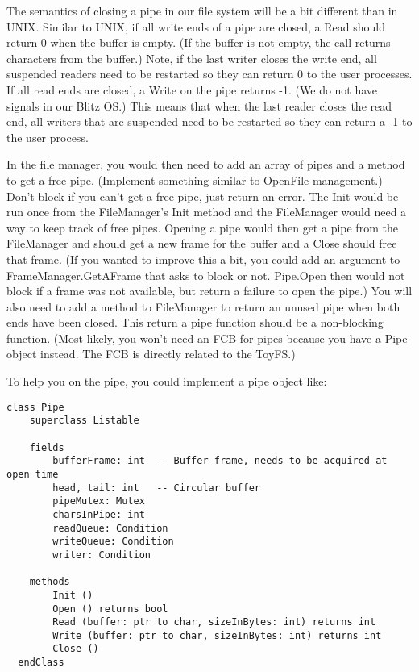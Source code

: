 \documentclass[11pt]{article}
\begin{document}
The semantics of closing a pipe in our file system will be a bit
different than in UNIX.  Similar to UNIX, if all write ends of a pipe
are closed, a Read should return 0 when the buffer is empty. (If the
buffer is not empty, the call returns characters from the buffer.)
Note, if the last writer closes the write end, all suspended readers
need to be restarted so they can return 0 to the user processes.  If
all read ends are closed, a Write on the pipe returns -1. (We do not
have signals in our Blitz OS.)  This means that when the last reader
closes the read end, all writers that are suspended need to be
restarted so they can return a -1 to the user process.

In the file manager, you would then need to add an array of pipes and
a method to get a free pipe. (Implement something similar to OpenFile
management.) Don't block if you can't get a free pipe, just return an
error.  The Init would be run once from the FileManager's Init method
and the FileManager would need a way to keep track of free pipes.
Opening a pipe would then get a pipe from the FileManager and should
get a new frame for the buffer and a Close should free that frame.
(If you wanted to improve this a bit, you could add an argument to
FrameManager.GetAFrame that asks to block or not.  Pipe.Open then
would not block if a frame was not available, but return a failure to
open the pipe.)  You will also need to add a method to FileManager to
return an unused pipe when both ends have been closed.  This return a
pipe function should be a non-blocking function.  (Most likely, you
won't need an FCB for pipes because you have a Pipe object
instead. The FCB is directly related to the ToyFS.)

To help you on the pipe, you could implement a pipe object like:
 
\begin{verbatim}
class Pipe
    superclass Listable

    fields
        bufferFrame: int  -- Buffer frame, needs to be acquired at open time
        head, tail: int   -- Circular buffer
        pipeMutex: Mutex
        charsInPipe: int
        readQueue: Condition        
        writeQueue: Condition
        writer: Condition

    methods
        Init ()
        Open () returns bool
        Read (buffer: ptr to char, sizeInBytes: int) returns int
        Write (buffer: ptr to char, sizeInBytes: int) returns int
        Close ()
  endClass
\end{verbatim}
\end{document}
